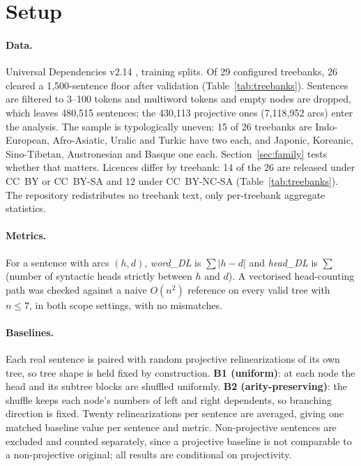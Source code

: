 \documentclass[11pt]{article}
\begin{document}
\section{Setup}
\label{sec:setup}

\paragraph{Data.} Universal Dependencies v2.14 \citep{zeman2024ud214}, training splits. Of 29 configured treebanks, 26 cleared a 1,500-sentence floor after validation (Table~\ref{tab:treebanks}). Sentences are filtered to 3--100 tokens and multiword tokens and empty nodes are dropped, which leaves 480,515 sentences; the 430,113 projective ones (7,118,952 arcs) enter the analysis. The sample is typologically uneven: 15 of 26 treebanks are Indo-European, Afro-Asiatic, Uralic and Turkic have two each, and Japonic, Koreanic, Sino-Tibetan, Austronesian and Basque one each. Section~\ref{sec:family} tests whether that matters. Licences differ by treebank: 14 of the 26 are released under CC~BY or CC~BY-SA and 12 under CC~BY-NC-SA (Table~\ref{tab:treebanks}). The repository redistributes no treebank text, only per-treebank aggregate statistics.

\paragraph{Metrics.} For a sentence with arcs $(h,d)$, \emph{word\_DL} is $\sum |h-d|$ and \emph{head\_DL} is $\sum$ (number of syntactic heads strictly between $h$ and $d$). A vectorised head-counting path was checked against a naive $O(n^2)$ reference on every valid tree with $n\le 7$, in both scope settings, with no mismatches.

\paragraph{Baselines.} Each real sentence is paired with random projective relinearizations of its own tree, so tree shape is held fixed by construction. \textbf{B1 (uniform)}: at each node the head and its subtree blocks are shuffled uniformly. \textbf{B2 (arity-preserving)}: the shuffle keeps each node's numbers of left and right dependents, so branching direction is fixed. Twenty relinearizations per sentence are averaged, giving one matched baseline value per sentence and metric. Non-projective sentences are excluded and counted separately, since a projective baseline is not comparable to a non-projective original; all results are conditional on projectivity.
\end{document}
